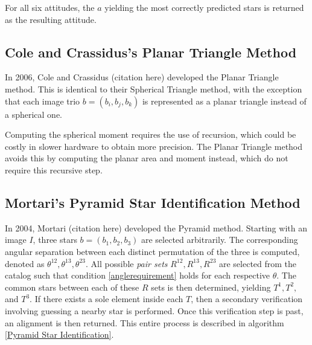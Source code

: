 For all six attitudes, the $a$ yielding the most correctly predicted stars is returned as the resulting attitude.

\subsection{Cole and Crassidus's Planar Triangle Method}
In 2006, Cole and Crassidus (citation here) developed the Planar Triangle method. This is identical to their Spherical Triangle method, with the exception that each image trio $b = (b_i, b_j, b_k)$ is represented as a planar triangle instead of a spherical one. 

Computing the spherical moment requires the use of recursion, which could be costly in slower hardware to obtain more precision. The Planar Triangle method avoids this by computing the planar area and moment instead, which do not require this recursive step.

\subsection{Mortari's Pyramid Star Identification Method}
In 2004, Mortari (citation here) developed the Pyramid method. Starting with an image $I$, three stars $b = (b_1, b_2, b_3)$ are selected arbitrarily. The corresponding angular separation between each distinct permutation of the three is computed, denoted as $\theta^{12}, \theta^{13}, \theta^{23}$. All possible \textit{pair sets} $R^{12}, R^{13}, R^{23}$ are selected from the catalog such that condition \eqref{anglerequirement} holds for each respective $\theta$. The common stars between each of these $R$ sets is then determined, yielding $T^1, T^2, $ and $T^3$. If there exists a sole element inside each $T$, then a secondary verification involving guessing a nearby star is performed. Once this verification step is past, an alignment is then returned. This entire process is described in algorithm \eqref{Pyramid Star Identification}.

